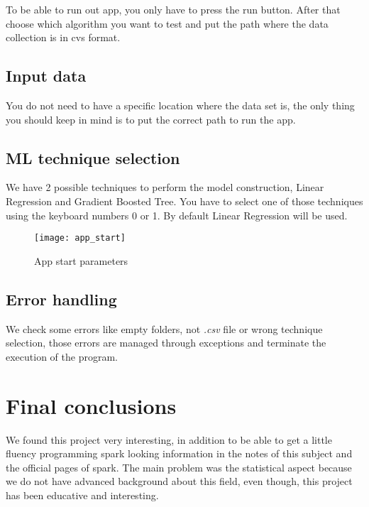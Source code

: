 To be able to run out app, you only have to press the run button. After that choose which algorithm you want to test and put the path where the data collection is in cvs format.

\subsection{Input data}

You do not need to have a specific location where the data set is, the only thing you should keep in mind is to put the correct path to run the app.

\subsection{ML technique selection}

We have 2 possible techniques to perform the model construction, Linear Regression and Gradient Boosted Tree. You have to select one of those techniques using the keyboard numbers 0 or 1. By default Linear Regression will be used.

\begin{figure}[H]
	\centering
	\texttt{[image: app\_start]}
	\caption{App start parameters}
\end{figure}

\subsection{Error handling}

We check some errors like empty folders, not \textit{.csv} file or wrong technique selection, those errors are managed through exceptions and terminate the execution of the program.

\section{Final conclusions}

We found this project very interesting, in addition to be able to get a little fluency programming spark looking information in the notes of this subject and the official pages of spark. The main problem was the statistical aspect because we do not have advanced background about this field, even though, this project has been educative and interesting.

